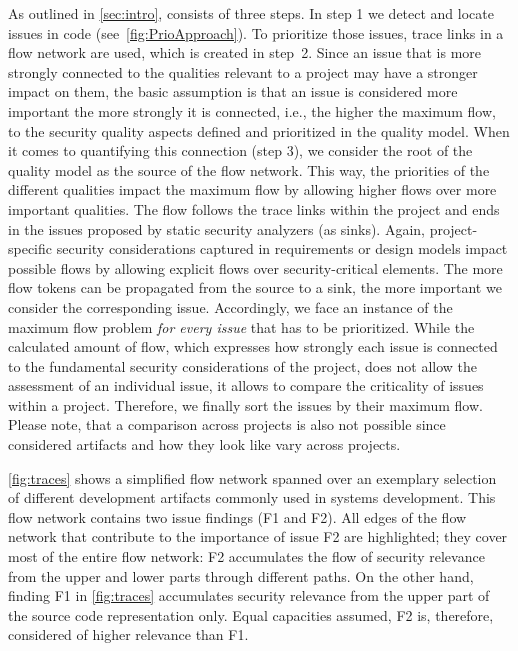 As outlined in \autoref{sec:intro}, \appr{} consists of three steps.
In step 1 we detect and locate issues in code (see~\autoref{fig:PrioApproach}).
To prioritize those issues, trace links in a flow network are used, which is created in step~2.
Since an issue that is more strongly connected to the qualities relevant to a project may have a stronger impact on them, the basic assumption is that an issue is considered more important the more strongly it is connected, i.e., the higher the maximum flow, to the security quality aspects defined and prioritized in the quality model.
When it comes to quantifying this connection (step 3), we consider the root of the quality model as the source of the flow network.
This way, the priorities of the different qualities impact the maximum flow by allowing higher flows over more important qualities.
The flow follows the trace links within the project and ends in the issues proposed by static security analyzers (as sinks).
Again, project-specific security considerations captured in requirements or design models impact possible flows by allowing explicit flows over security-critical elements.
The more flow tokens can be propagated from the source to a sink, the more important we consider the corresponding issue.
Accordingly, we face an instance of the maximum flow problem \emph{for every issue} that has to be prioritized.
While the calculated amount of flow, which expresses how strongly each issue is connected to the fundamental security considerations of the project, does not allow the assessment of an individual issue, it allows to compare the criticality of issues within a project.
Therefore, we finally sort the issues by their maximum flow.
Please note, that a comparison across projects is also not possible since considered artifacts and how they look like vary across projects.

\autoref{fig:traces} shows a simplified flow network spanned over an exemplary selection of different development artifacts commonly used in systems development.
This flow network contains two issue findings (F1 and F2).
All edges of the flow network that contribute to the importance of issue F2 are highlighted;
they cover most of the entire flow network: F2 accumulates the flow of security relevance from the upper and lower parts through different paths.
On the other hand, finding F1 in \autoref{fig:traces} accumulates security relevance from the upper part of the source code representation only.
Equal capacities assumed, F2 is, therefore, considered of higher relevance than F1.



